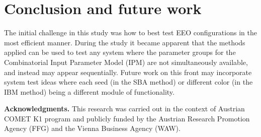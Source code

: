 \documentclass[conference]{IEEEtran}
\begin{document}
\section{Conclusion and future work}
	
The initial challenge in this study was how to best test EEO configurations in the most efficient manner.
During the study it became apparent that the methods applied can be used to test any system where the parameter groups for
the Combinatorial Input Parameter Model (IPM) are not simultaneously available, and instead may appear sequentially.
Future work on this front may incorporate system test ideas where each seed (in the SBA method) or different color (in the IBM method) being a different module of functionality.

\textbf{Acknowledgments.}
This research was carried out in the context of Austrian COMET K1
program and publicly funded by the Austrian Research Promotion Agency
(FFG) and the Vienna Business Agency (WAW).



\end{document}
